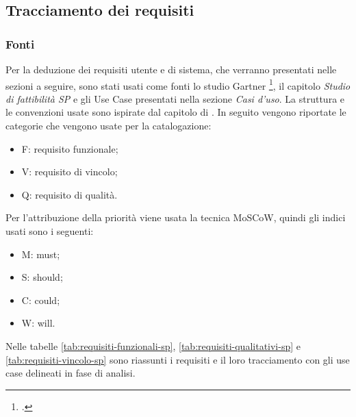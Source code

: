 \subsection{Tracciamento dei requisiti}
\subsubsection{Fonti}
Per la deduzione dei requisiti utente e di sistema, che verranno presentati nelle sezioni a seguire, sono stati usati come fonti lo studio Gartner \footcite{farah:The-Dawn-of-Decentralized-Identity}, il capitolo \emph{Studio di fattibilità SP} e gli Use Case presentati nella sezione \emph{Casi d'uso}. La struttura e le convenzioni usate sono ispirate dal capitolo di \cite{som:swe}. In seguito vengono riportate le categorie che vengono usate per la catalogazione:
\begin{itemize}
    \item F: requisito funzionale;
    \item V: requisito di vincolo;
    \item Q: requisito di qualità.
\end{itemize}
    
Per l’attribuzione della priorità viene usata la tecnica MoSCoW, quindi gli indici usati sono i seguenti:
\begin{itemize}
    \item M: must;
    \item S: should; 
    \item C: could; 
    \item W: will.
\end{itemize} 
    
Nelle tabelle \ref{tab:requisiti-funzionali-sp}, \ref{tab:requisiti-qualitativi-sp} e \ref{tab:requisiti-vincolo-sp} sono riassunti i requisiti e il loro tracciamento con gli use case delineati in fase di analisi.

